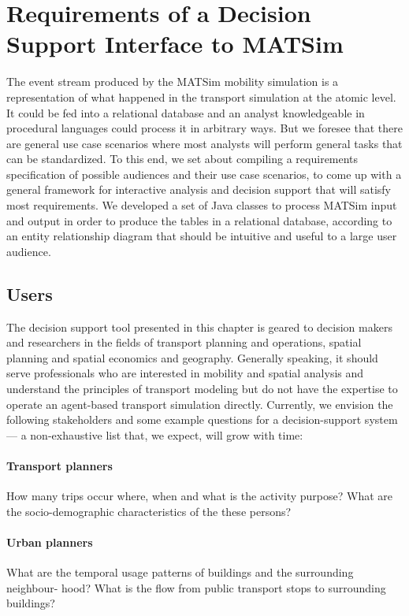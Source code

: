 \section{Requirements of a Decision Support Interface to MATSim}
\label{sec:analyticsRequirements}
The event stream produced by the MATSim mobility simulation is a representation of what happened in the transport simulation at the atomic level. It could be fed into a relational database and an analyst knowledgeable in procedural languages could process it in arbitrary ways. But we foresee that there are general use case scenarios where most analysts will perform general tasks that can be standardized. To this end, we set about compiling a requirements specification of possible audiences and their use case scenarios, to come up with a general framework for interactive analysis and decision support that will satisfy most requirements. We developed a set of Java classes to process MATSim input and output in order to produce the tables in a relational database, according to an entity relationship diagram that should be intuitive and useful to a large user audience.

\subsection{Users}
The decision support tool presented in this chapter is geared to decision makers and researchers
in the fields of transport planning and operations, spatial planning and spatial economics and
geography. Generally speaking, it should serve professionals who are interested in mobility
and spatial analysis and understand the principles of transport modeling but do not have the
expertise to operate an agent-based transport simulation directly. Currently, we envision the
following stakeholders and some example questions for a decision-support system --- a non-exhaustive list that, we expect, will grow with time:
\paragraph{Transport planners}
How many trips occur where, when and what is the activity purpose?
What are the socio-demographic characteristics of the these persons?
\paragraph{Urban planners}
What are the temporal usage patterns of buildings and the surrounding neighbour-
hood?
What is the flow from public transport stops to surrounding buildings?
